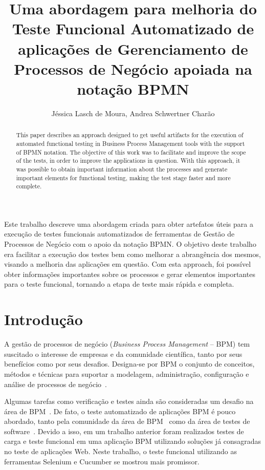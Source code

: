 \documentclass[12pt]{article}
\title{Uma abordagem para melhoria do Teste Funcional Automatizado de aplicações de Gerenciamento de Processos de Negócio apoiada na notação BPMN}
\author{Jéssica Lasch de Moura\inst{1}, Andrea Schwertner Charão\inst{1}}
\begin{document}
 

\maketitle

\begin{abstract}
This paper describes an approach designed to get useful artifacts for the execution of automated functional testing in Business Process Management tools with the support of BPMN notation. The objective of this work was to facilitate and improve the scope of the tests, in order to improve the applications in question. With this approach, it was possible to obtain important information about the processes and generate important elements for functional testing, making the test stage faster and more complete.
\end{abstract}
     
\begin{resumo} 
Este trabalho descreve uma abordagem criada para obter artefatos úteis para a execução de testes funcionais automatizados de ferramentas de Gestão de Processos de Negócio com o apoio da notação BPMN. O objetivo deste trabalho era facilitar a execução dos testes bem como melhorar a abrangência dos mesmos, visando a melhoria das aplicações em questão. Com esta approach, foi possível obter informações importantes sobre os processos e gerar elementos importantes para o teste funcional, tornando a etapa de teste mais rápida e completa.
\end{resumo}

\section{Introdução}

A gestão de processos de negócio (\emph{Business Process Management} -- BPM) tem suscitado o interesse de empresas e da comunidade científica, tanto por seus benefícios como por seus desafios. Designa-se por BPM o conjunto de conceitos, métodos e técnicas para suportar a modelagem, administração, configuração e análise de processos de negócio~\cite{weske}. %

Algumas tarefas como verificação e testes ainda são consideradas um desafio na área de BPM~\cite{aalst2013survey}. De fato, o teste automatizado de aplicações BPM é pouco abordado, tanto pela comunidade da área de BPM~\cite{weske} como da área de testes de software~\cite{graham2012experiences}. Devido a isso, em um trabalho anterior \cite{sbqs2015} foram realizados testes de carga e teste funcional em uma aplicação BPM utilizando soluções já consagradas no teste de aplicações Web. Neste trabalho, o teste funcional utilizando as ferramentas Selenium e Cucumber se mostrou mais promissor.
\end{document}
